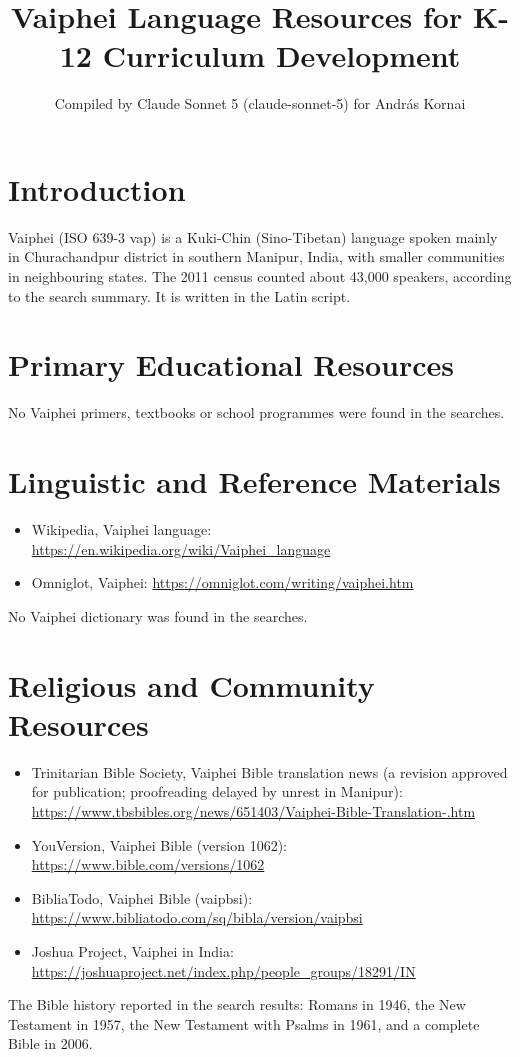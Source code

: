 \documentclass[12pt]{article}
\title{Vaiphei Language Resources for K-12 Curriculum Development}
\author{Compiled by Claude Sonnet 5 (claude-sonnet-5) for Andr\'as Kornai}
\date{}
\begin{document}
\maketitle

\section{Introduction}
Vaiphei (ISO 639-3 vap) is a Kuki-Chin (Sino-Tibetan) language spoken mainly in Churachandpur district in southern Manipur, India, with smaller communities in neighbouring states. The 2011 census counted about 43,000 speakers, according to the search summary. It is written in the Latin script.

\section{Primary Educational Resources}
No Vaiphei primers, textbooks or school programmes were found in the searches.

\section{Linguistic and Reference Materials}
\begin{itemize}
\item Wikipedia, Vaiphei language: \url{https://en.wikipedia.org/wiki/Vaiphei_language}
\item Omniglot, Vaiphei: \url{https://omniglot.com/writing/vaiphei.htm}
\end{itemize}
No Vaiphei dictionary was found in the searches.

\section{Religious and Community Resources}
\begin{itemize}
\item Trinitarian Bible Society, Vaiphei Bible translation news (a revision approved for publication; proofreading delayed by unrest in Manipur): \url{https://www.tbsbibles.org/news/651403/Vaiphei-Bible-Translation-.htm}
\item YouVersion, Vaiphei Bible (version 1062): \url{https://www.bible.com/versions/1062}
\item BibliaTodo, Vaiphei Bible (vaipbsi): \url{https://www.bibliatodo.com/sq/bibla/version/vaipbsi}
\item Joshua Project, Vaiphei in India: \url{https://joshuaproject.net/index.php/people_groups/18291/IN}
\end{itemize}
The Bible history reported in the search results: Romans in 1946, the New Testament in 1957, the New Testament with Psalms in 1961, and a complete Bible in 2006.
\end{document}
